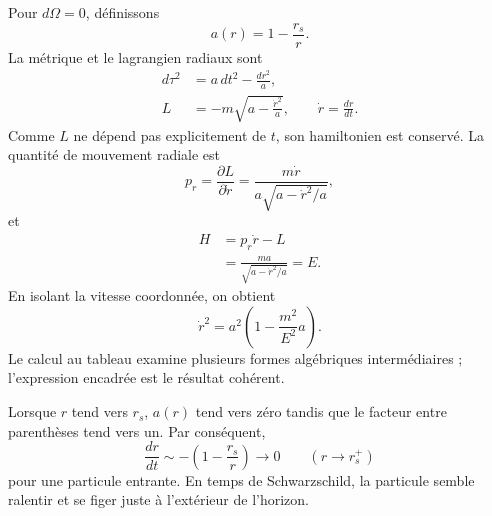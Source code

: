 Pour \(d\Omega=0\), définissons
\begin{equation}
a(r)=1-\frac{r_s}{r}.
\label{eq:l5-a-def}
\end{equation}
La métrique et le lagrangien radiaux sont
\begin{align}
d\tau^2&=a\,dt^2-\frac{dr^2}{a},\\
L&=-m\sqrt{a-\frac{\dot r^2}{a}},
\qquad
\dot r=\frac{dr}{dt}.
\label{eq:l5-radial-lagrangian}
\end{align}
Comme \(L\) ne dépend pas explicitement de \(t\), son hamiltonien est conservé. La quantité de mouvement radiale est
\begin{equation}
p_r=\frac{\partial L}{\partial\dot r}
=\frac{m\dot r}{a\sqrt{a-\dot r^2/a}},
\label{eq:l5-radial-momentum}
\end{equation}
et
\begin{align}
H
&=p_r\dot r-L\\
&=\frac{ma}{\sqrt{a-\dot r^2/a}}
=E.
\label{eq:l5-radial-energy}
\end{align}
En isolant la vitesse coordonnée, on obtient
\begin{equation}
\boxed{
\dot r^2
=a^2\left(1-\frac{m^2}{E^2}a\right).
}
\label{eq:l5-radial-velocity}
\end{equation}
Le calcul au tableau examine plusieurs formes algébriques intermédiaires ; l’expression encadrée est le résultat cohérent.

Lorsque \(r\) tend vers \(r_s\), \(a(r)\) tend vers zéro tandis que le facteur entre parenthèses tend vers un. Par conséquent,
\begin{equation}
\frac{dr}{dt}
\sim -\left(1-\frac{r_s}{r}\right)
\longrightarrow 0
\qquad(r\longrightarrow r_s^+)
\label{eq:l5-infall-freeze}
\end{equation}
pour une particule entrante. En temps de Schwarzschild, la particule semble ralentir et se figer juste à l’extérieur de l’horizon.

\begin{classroomqa}
\end{classroomqa}

